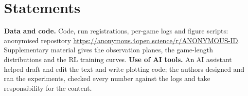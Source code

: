 \documentclass[conference]{IEEEtran}
\begin{document}
\section*{Statements}
\noindent\textbf{Data and code.} Code, run registrations, per-game logs and figure scripts: anonymised repository \url{https://anonymous.4open.science/r/ANONYMOUS-ID}. Supplementary material gives the observation planes, the game-length distributions and the RL training curves.
\noindent\textbf{Use of AI tools.} An AI assistant helped draft and edit the text and write plotting code; the authors designed and ran the experiments, checked every number against the logs and take responsibility for the content.



\end{document}
